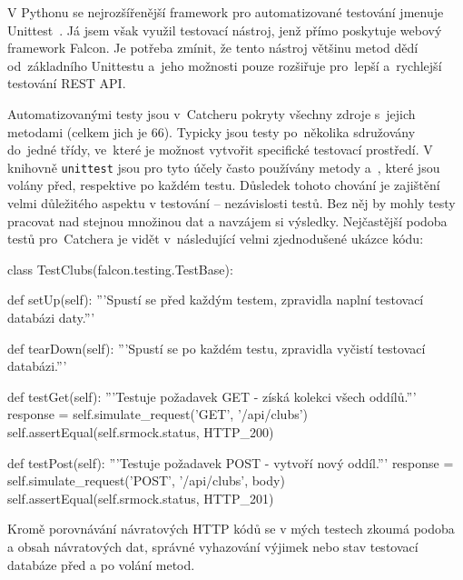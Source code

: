 V Pythonu se nejrozšířenější framework pro automatizované testování jmenuje Unittest~\cite{python_unittest}. Já jsem však využil testovací nástroj, jenž přímo
poskytuje webový framework Falcon. Je potřeba zmínit, že tento nástroj většinu metod dědí od~základního Unittestu a~jeho možnosti pouze
rozšiřuje pro~lepší a~rychlejší testování REST API.

Automatizovanými testy jsou v~Catcheru pokryty všechny zdroje s~jejich metodami (celkem jich je 66). Typicky jsou testy po~několika sdružovány do~jedné třídy,
ve~které je možnost vytvořit specifické testovací prostředí. V knihovně \texttt{unittest} jsou pro tyto účely často používány metody  a~,
které jsou volány před, respektive po každém testu. Důsledek tohoto chování je zajištění velmi důležitého aspektu v testování -- nezávislosti testů.
Bez něj by mohly testy pracovat nad stejnou množinou dat a navzájem si  výsledky.
Nejčastější podoba testů pro~Catchera je vidět v~následující velmi zjednodušené ukázce kódu: 

\begin{python}
class TestClubs(falcon.testing.TestBase):

    def setUp(self):
      '''Spustí se před každým testem,
      zpravidla naplní testovací databázi daty.'''

    def tearDown(self):
      '''Spustí se po každém testu,
      zpravidla vyčistí testovací databázi.'''

    def testGet(self):
      '''Testuje požadavek GET - získá kolekci všech oddílů.'''     
      response = self.simulate_request('GET', '/api/clubs')
      self.assertEqual(self.srmock.status, HTTP_200)

    def testPost(self):
      '''Testuje požadavek POST - vytvoří nový oddíl.'''
      response = self.simulate_request('POST', '/api/clubs', body)
      self.assertEqual(self.srmock.status, HTTP_201)
\end{python}

Kromě porovnávání návratových HTTP kódů se v mých testech zkoumá podoba a obsah návratových dat, správné vyhazování výjimek
nebo stav testovací databáze před a po volání metod.
